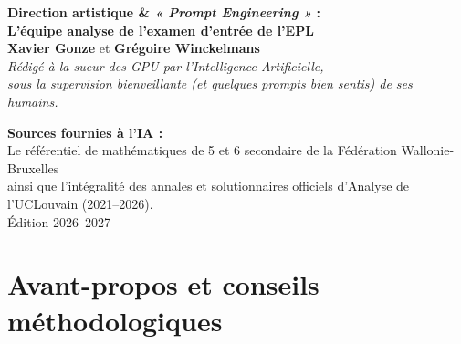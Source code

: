 \documentclass[11pt,a4paper,oneside]{book}
\begin{document}
\begin{titlepage}

    \vfill

    {\large \textbf{Direction artistique \& \emph{« Prompt Engineering »} :}}\\[0.2cm]
    {\Large \textbf{L'équipe analyse de l'examen d'entrée de l'EPL}}\\[0.15cm]
    {\large \textbf{Xavier Gonze} et \textbf{Grégoire Winckelmans}}\\[0.3cm]
    {\normalsize \emph{Rédigé à la sueur des GPU par l'Intelligence Artificielle,\\ sous la supervision bienveillante (et quelques prompts bien sentis) de ses humains.}}

    \vspace{0.5cm}
    {\small \textbf{Sources fournies à l'IA :}\\
    Le référentiel de mathématiques de 5\ieme{} et 6\ieme{} secondaire de la Fédération Wallonie-Bruxelles\\
    ainsi que l'intégralité des annales et solutionnaires officiels d'Analyse de l'UCLouvain (2021--2026).}\\[0.4cm]
    {\normalsize Édition 2026--2027}
\end{titlepage}

\chapter*{Avant-propos et conseils méthodologiques}
\end{document}
